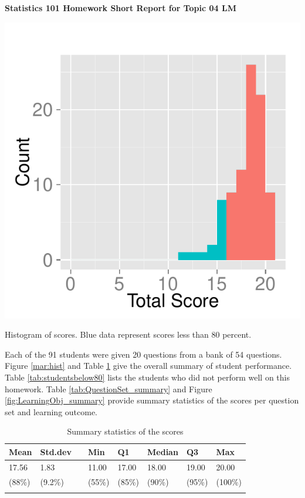 \documentclass[12pt,english,nohyper]{tufte-handout}\usepackage[]{graphicx}\usepackage[]{color}
\begin{document}
\centerline{\Large\bf Statistics 101 Homework Short Report for Topic 04 LM}
\vspace{1cm}

\begin{marginfigure}
\includegraphics[width=0.98\linewidth]{Topic04_LM_score}
\caption{\label{mar:hist}Histogram of scores. Blue data represent scores less than 80 percent.}
\end{marginfigure}

Each of the 91 students were given 20 questions from a bank of 54 questions. Figure \ref{mar:hist} and Table \ref{tab:summary} give the overall summary of student performance. Table \ref{tab:studentsbelow80} lists the students who did not perform well on this homework. Table \ref{tab:QuestionSet_summary} and Figure \ref{fig:LearningObj_summary} provide summary statistics of the scores per question set and learning outcome.
\bigskip{}

\begin{longtable}{llllllll}
  \hline
Mean & Std.dev &   & Min & Q1 & Median & Q3 & Max \\ 
  \hline
17.56 & 1.83 &  & 11.00 & 17.00 & 18.00 & 19.00 & 20.00 \\ 
  (88\%) & (9.2\%) &  & (55\%) & (85\%) & (90\%) & (95\%) & (100\%) \\ 
   \hline
\hline
\caption{Summary statistics of the scores} 
\label{tab:summary}
\end{longtable}
\end{document}
